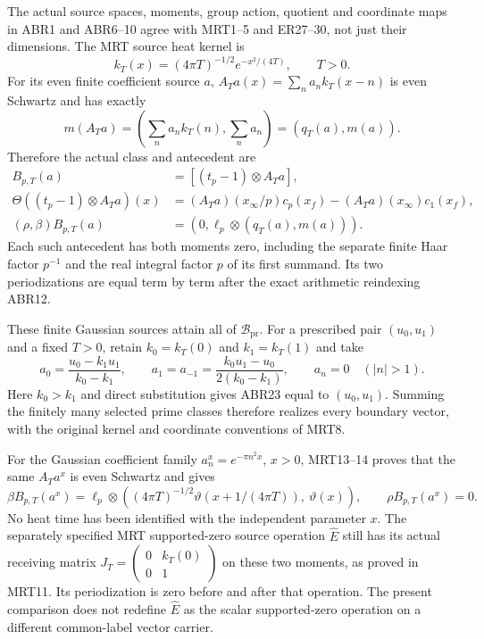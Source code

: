 The actual source spaces, moments, group action, quotient and
coordinate maps in ABR1 and ABR6--10 agree with MRT1--5 and
ER27--30, not just their dimensions. The MRT source heat kernel is
\[
 k_T(x)=(4\pi T)^{-1/2}e^{-x^2/(4T)},\qquad T>0.
\]
For its even finite coefficient source $a$,
$A_Ta(x)=\sum_na_nk_T(x-n)$ is even Schwartz and has exactly
\begin{equation}\tag{ABR23}
 m(A_Ta)=\left(\sum_na_nk_T(n),\sum_na_n\right)
                  =(q_T(a),m(a)).
\end{equation}
Therefore the actual class and antecedent are
\begin{equation}\tag{ABR24}
 \begin{split}
 B_{p,T}(a)&=[(t_p-1)\otimes A_Ta],\\
 \Theta((t_p-1)\otimes A_Ta)(x)
  &=(A_Ta)(x_\infty/p)c_p(x_f)-(A_Ta)(x_\infty)c_1(x_f),\\
 (\rho,\beta)B_{p,T}(a)
  &=\left(0,\ell_p\otimes(q_T(a),m(a))\right).
 \end{split}
\end{equation}
Each such antecedent has both moments zero, including the separate
finite Haar factor $p^{-1}$ and the real integral factor $p$ of
its first summand. Its two periodizations are equal term by term
after the exact arithmetic reindexing ABR12.

These finite Gaussian sources attain all of $\mathcal B_{\mathrm{pr}}$.
For a prescribed pair $(u_0,u_1)$ and a fixed $T>0$, retain
$k_0=k_T(0)$ and $k_1=k_T(1)$ and take
\[
 a_0=\frac{u_0-k_1u_1}{k_0-k_1},\qquad
 a_1=a_{-1}=\frac{k_0u_1-u_0}{2(k_0-k_1)},\qquad
 a_n=0\quad(|n|>1).
\]
Here $k_0>k_1$ and direct substitution gives ABR23 equal to
$(u_0,u_1)$. Summing the finitely many selected prime classes
therefore realizes every boundary vector, with the original
kernel and coordinate conventions of MRT8.

For the Gaussian coefficient family $a_n^x=e^{-\pi n^2x}$,
$x>0$, MRT13--14 proves that the same $A_Ta^x$ is even Schwartz
and gives
\begin{equation}\tag{ABR25}
 \beta B_{p,T}(a^x)
 =\ell_p\otimes\left(
 (4\pi T)^{-1/2}\vartheta(x+1/(4\pi T)),\ \vartheta(x)\right),
 \qquad \rho B_{p,T}(a^x)=0.
\end{equation}
No heat time has been identified with the independent parameter $x$.
The separately specified MRT supported-zero source operation
$\widehat E$ still has its actual receiving matrix
$J_T=\left(\begin{smallmatrix}0&k_T(0)\\0&1\end{smallmatrix}\right)$
on these two moments, as proved in MRT11. Its periodization is
zero before and after that operation. The present comparison does
not redefine $\widehat E$ as the scalar supported-zero operation
on a different common-label vector carrier.

